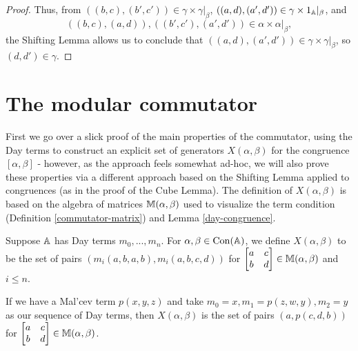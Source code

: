 \begin{appendices}
\begin{proof}
Thus, from $((b,c),(b',c')) \in \gamma \times \gamma|_\beta$, $((a,d),(a',d')) \in \gamma \times 1_{\mathbb{A}}|_\beta$, and
\[
((b,c),(a,d)), ((b',c'),(a',d')) \in \alpha\times\alpha|_\beta,
\]
the Shifting Lemma allows us to conclude that $((a,d),(a',d')) \in \gamma \times \gamma|_\beta$, so $(d,d') \in \gamma$.
\end{proof}


\section{The modular commutator}

First we go over a slick proof of the main properties of the commutator, using the Day terms to construct an explicit set of generators $X(\alpha,\beta)$ for the congruence $[\alpha,\beta]$ - however, as the approach feels somewhat ad-hoc, we will also prove these properties via a different approach based on the Shifting Lemma applied to congruences (as in the proof of the Cube Lemma). The definition of $X(\alpha,\beta)$ is based on the algebra of matrices $\mathbb{M}(\alpha,\beta)$ used to visualize the term condition (Definition \ref{commutator-matrix}) and Lemma \ref{day-congruence}.

\begin{defn} Suppose $\mathbb{A}$ has Day terms $m_0, ..., m_n$. For $\alpha, \beta \in \operatorname{Con}(\mathbb{A})$, we define $X(\alpha,\beta)$ to be the set of pairs $(m_i(a,b,a,b),m_i(a,b,c,d))$ for $\begin{bmatrix} a & c\\ b & d\end{bmatrix} \in \mathbb{M}(\alpha,\beta)$ and $i \le n$.
\end{defn}

\begin{ex} If we have a Mal'cev term $p(x,y,z)$ and take $m_0 = x, m_1 = p(z,w,y), m_2 = y$ as our sequence of Day terms, then $X(\alpha,\beta)$ is the set of pairs $(a,p(c,d,b))$ for $\begin{bmatrix} a & c\\ b & d\end{bmatrix} \in \mathbb{M}(\alpha,\beta)$.
\end{ex}


\end{appendices}

